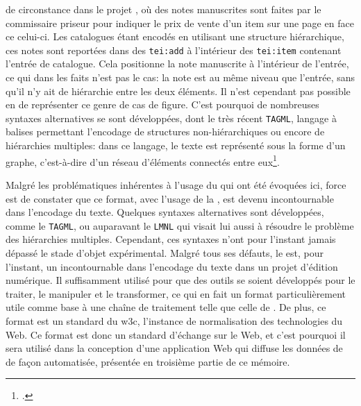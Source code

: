 de circonstance dans le projet \mssktb{}, où des notes manuscrites sont faites par le commissaire priseur pour indiquer le prix de vente d'un item sur une page en face ce celui-ci. Les catalogues étant encodés en utilisant une structure hiérarchique, ces notes sont reportées dans des \texttt{tei:add} à l'intérieur des \texttt{tei:item} contenant l'entrée de catalogue. Cela positionne la note manuscrite à l'intérieur de l'entrée, ce qui dans les faits n'est pas le cas: la note est au même niveau que l'entrée, sans qu'il n'y ait de hiérarchie entre les deux éléments. Il n'est cependant pas possible en \xml{} de représenter ce genre de cas de figure. C'est pourquoi de nombreuses syntaxes alternatives se sont développées, dont le très récent \texttt{TAGML}, langage à balises permettant l'encodage de structures non-hiérarchiques ou encore de hiérarchies multiples: dans ce langage, le texte est représenté sous la forme d'un graphe, c'est-à-dire d'un réseau d'éléments connectés entre eux\footcite{bleeker_texts_2021}.

Malgré les problématiques inhérentes à l'usage du \xml{} qui ont été évoquées ici, force est de constater que ce format, avec l'usage de la \tei{}, est devenu incontournable dans l'encodage du texte. Quelques syntaxes alternatives sont développées, comme le \texttt{TAGML}, ou auparavant le \texttt{LMNL} qui visait lui aussi à résoudre le problème des hiérarchies multiples. Cependant, ces syntaxes n'ont pour l'instant jamais dépassé le stade d'objet expérimental. Malgré tous ses défauts, le \xml{} est, pour l'instant, un incontournable dans l'encodage du texte dans un projet d'édition numérique. Il suffisamment utilisé pour que des outils se soient développés pour le traiter, le manipuler et le transformer, ce qui en fait un format particulièrement utile comme base à une chaîne de traitement telle que celle de \mssktb{}. De plus, ce format est un standard du \gls{w3c}, l'instance de normalisation des technologies du Web. Ce format est donc un standard d'échange sur le Web, et c'est pourquoi il sera utilisé dans la conception d'une application Web qui diffuse les données de \mssktb{} de façon automatisée, présentée en troisième partie de ce mémoire.

